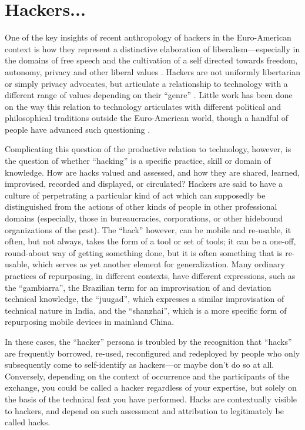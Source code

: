 \documentclass[10pt,letter,oneside]{scrartcl}
\begin{document}
\section*{Hackers...}

One of the key insights of recent anthropology of hackers in the Euro-American
context is how they represent a distinctive elaboration of
liberalism---especially in the domains of free speech and the cultivation of a
self directed towards freedom, autonomy, privacy and other liberal
values \parencite{coleman_coding_2012,kelty_two_2008,coleman_hacker_2014}. Hackers
are not uniformly libertarian or simply privacy advocates, but articulate a
relationship to technology with a different range of values depending on their
``genre'' \parencite{coleman_hacker_2008}. Little work has been done on the way
this relation to technology articulates with different political and
philosophical traditions outside the Euro-American world, though a handful of
people have advanced such questioning
\cite{xiang_2007,takhteyev_coding_2012,chan_networking_2013}.

Complicating this question of the productive relation to technology, however, is
the question of whether ``hacking'' is a specific practice, skill or domain of
knowledge.  How are hacks valued and assessed, and how they are shared, learned,
improvised, recorded and displayed, or circulated?  Hackers are said to have a
culture of perpetrating a particular kind of act which can supposedly be
distinguished from the actions of other kinds of people in other professional
domains (especially, those in bureaucracies, corporations, or other hidebound
organizations of the past).  The ``hack'' however, can be mobile and re-usable,
it often, but not always, takes the form of a tool or set of tools; it can be a
one-off, round-about way of getting something done, but it is often something
that is re-usable, which serves as yet another element for generalization.  Many
ordinary practices of repurposing, in different contexts, have different
expressions, such as the ``gambiarra'', the Brazilian term for an improvisation
of and deviation technical knowledge, the ``juugad'', which expresses a similar
improvisation of technical nature in India, and the ``shanzhai'', which is a
more specific form of repurposing mobile devices in mainland China.


In these cases, the ``hacker'' persona is troubled by the recognition that
``hacks'' are frequently borrowed, re-used, reconfigured and redeployed by
people who only subsequently come to self-identify as hackers---or maybe
don’t do so at all.  Conversely, depending on the context of occurrence and the
participants of the exchange, you could be called a hacker regardless of your
expertise, but solely on the basis of the technical feat you have performed.
Hacks are contextually visible to hackers, and depend on such assessment and
attribution to legitimately be called hacks.
\end{document}
